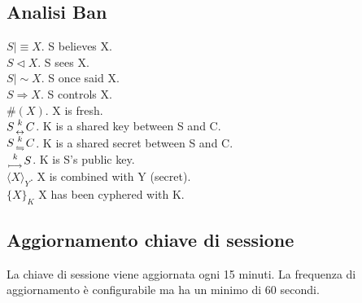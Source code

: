 \documentclass[a4paper,titlepage]{article}
\begin{document}
\subsection{Analisi Ban}

$ S \mid \equiv X  $. S believes X.\\
$ S \lhd X  $. S sees X.\\
$ S \mid \sim X  $. S once said X.\\
$ S \Rightarrow X $. S controls X.\\ 
$ \#(X) $. X is fresh.\\
$S {k \atop \leftrightarrow} C $. K is a shared key between S and C.\\ 
$S {k \atop \leftrightharpoons} C $. K is a shared secret between S and C.\\ 
${k  \atop \longmapsto} S $. K is S's public key.\\
$\langle X \rangle_{Y}$. X is combined with Y (secret).\\
$\{X\}_{K}$ X has been cyphered with K.

\subsection{Aggiornamento chiave di sessione}
La chiave di sessione viene aggiornata ogni 15 minuti. La frequenza di aggiornamento è configurabile ma ha un minimo di 60 secondi. 
\end{document}
